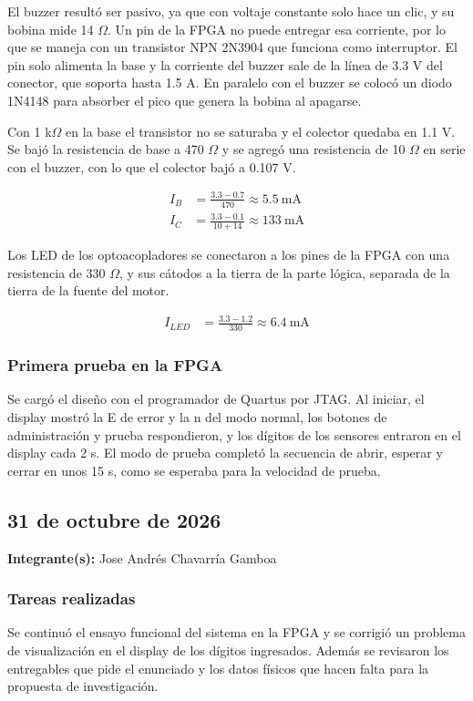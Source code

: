 \documentclass[11pt,letterpaper]{article}
\newcommand{\entrada}[2]{%
  \subsection*{#1}%
  \addcontentsline{toc}{subsection}{#1}%
  \noindent\textbf{Integrante(s):} #2\par\medskip
}
\begin{document}
El buzzer resultó ser pasivo, ya que con voltaje constante solo hace un clic, y su bobina mide 14 $\Omega$. Un pin de la FPGA no puede entregar esa corriente, por lo que se maneja con un transistor NPN 2N3904 que funciona como interruptor. El pin solo alimenta la base y la corriente del buzzer sale de la línea de 3.3 V del conector, que soporta hasta 1.5 A. En paralelo con el buzzer se colocó un diodo 1N4148 para absorber el pico que genera la bobina al apagarse.

Con 1 k$\Omega$ en la base el transistor no se saturaba y el colector quedaba en 1.1 V. Se bajó la resistencia de base a 470 $\Omega$ y se agregó una resistencia de 10 $\Omega$ en serie con el buzzer, con lo que el colector bajó a 0.107 V.

\begin{align*}
I_B &= \frac{3.3 - 0.7}{470} \approx 5.5\ \text{mA} \\
I_C &= \frac{3.3 - 0.1}{10 + 14} \approx 133\ \text{mA}
\end{align*}

Los LED de los optoacopladores se conectaron a los pines de la FPGA con una resistencia de 330 $\Omega$, y sus cátodos a la tierra de la parte lógica, separada de la tierra de la fuente del motor.

\begin{align*}
I_{LED} &= \frac{3.3 - 1.2}{330} \approx 6.4\ \text{mA}
\end{align*}

\subsubsection*{Primera prueba en la FPGA}

Se cargó el diseño con el programador de Quartus por JTAG. Al iniciar, el display mostró la E de error y la n del modo normal, los botones de administración y prueba respondieron, y los dígitos de los sensores entraron en el display cada 2 s. El modo de prueba completó la secuencia de abrir, esperar y cerrar en unos 15 s, como se esperaba para la velocidad de prueba.

\entrada{31 de octubre de 2026}{Jose Andrés Chavarría Gamboa}

\subsubsection*{Tareas realizadas}

Se continuó el ensayo funcional del sistema en la FPGA y se corrigió un problema de visualización en el display de los dígitos ingresados. Además se revisaron los entregables que pide el enunciado y los datos físicos que hacen falta para la propuesta de investigación.
\end{document}
